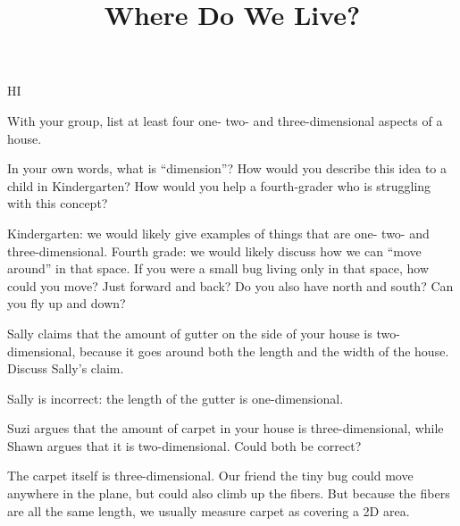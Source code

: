 \documentclass[nooutcomes,noauthor, handout]{ximera}
\title{Where Do We Live?}
\begin{document}
\begin{abstract}
\end{abstract}


\maketitle

HI
\begin{problem}
    With your group, list at least four one- two- and three-dimensional aspects of a house.
    

    

\end{problem}

\begin{problem}
    In your own words, what is ``dimension''?  How would you describe this idea to a child in Kindergarten?  How would you help a fourth-grader who is struggling with this concept?
    
        \begin{solution}
Kindergarten: we would likely give examples of things that are one- two- and three-dimensional. Fourth grade: we would likely discuss how we can ``move around'' in that space. If you were a small bug living only in that space, how could you move? Just forward and back? Do you also have north and south? Can you fly up and down?
    \end{solution}

\end{problem}

\begin{problem}
    Sally claims that the amount of gutter on the side of your house is two-dimensional, because it goes around both the length and the width of the house.  Discuss Sally's claim.
    
    \begin{solution}
    	Sally is incorrect: the length of the gutter is one-dimensional.
    \end{solution}
\end{problem}

\begin{problem}
    Suzi argues that the amount of carpet in your house is three-dimensional, while Shawn argues that it is two-dimensional.  Could both be correct?
    
    \begin{solution}
    	The carpet itself is three-dimensional. Our friend the tiny bug could move anywhere in the plane, but could also climb up the fibers. But because the fibers are all the same length, we usually measure carpet as covering a 2D area.
    \end{solution}
\end{problem}
\end{document}
